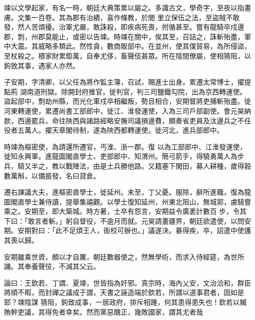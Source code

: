 \begin{pinyinscope}
 竦以文學起家，有名一時，朝廷大典策累以屬之。多識古文，學奇字，至夜以指畫膚。文集一百卷。其為郡有治績，喜作條教，於閭
 里立保伍之法，至盜賊不敢發，然人苦煩擾。治軍尤嚴，敢誅殺，即疾病死喪，拊循甚至。嘗有龍騎卒戍邊郡，剽，州郡莫能止，或密以告竦。時竦在關中，俟其至，召詰之，誅斬殆盡，軍中大震。其威略多類此。然性貪，數商販部中。在並州，使其僕貿易，為所侵盜，至杖殺之。積家財累鉅萬，自奉尤侈，畜聲伎甚眾。所在陰間僚屬，使相猜阻，以鉤致其事，遇家人亦然。



 子安期，字清卿，以父任為將作監主簿，召試，賜進士出身。累遷太常博士，擢提點荊
 湖南道刑獄。除開封府推官，徙判官，判三司鹽鐵勾院，出為京西轉運使。盜起部中，剽劫州縣，而光化軍戍卒相繼叛，勢且相合，安期督將吏捕斬殆盡。徙河東轉運使，累遷尚書工部郎中，徙江、淮發運使，入為三司戶部副使。會元昊納款，西邊罷兵，命往陜西與諸路經略安撫司議損邊費，頗奏省吏員及汰邊兵之不任役者五萬人。擢天章閣待制，遂為陜西都轉運使。徙河北，進兵部郎中。



 時竦為樞密使，為請還所遷官，丐淮、浙一郡。復
 以為工部郎中、江淮發運使，徙知永興軍。進龍圖閣直學士、吏部郎中、知渭州。簡弓箭手，得驍勇萬人為步兵，騎又半之，教以戰陣法，由是土兵勝他路。又籍塞下閑田，募人耕種，歲得穀數萬斛，以備振發，名曰貸倉。



 遷右諫議大夫，進樞密直學士，徙延州。未至，丁父憂。服除，辭所進職，復為龍圖閣直學士兼侍讀，提舉集禧觀。以學士復知延州，州東北阻山，無城郭，虜騎嘗乘之。安期至，即大築城。時方暑，士卒有怨言，安期益令廣袤計數百
 步，令其下曰：「敢言者斬。」躬自督役，不逾月而就。元昊請畫疆界，朝廷欲遣使，以問安期。安期對曰：「此不足煩王人，衙校可辦也。」議遂決。暴得疾，卒，詔遣中使護其喪以歸。



 安期雖乘世資，頗以才自厲，朝廷數器使之，然無學術，而求入侍經筵，為世所譏。其奉養聲伎，不減其父云。



 論曰：王欽若、丁謂、夏竦，世皆指為奸邪。真宗時，海內乂安，文治洽和，群臣將順不暇，而封禪之議成于謂，天書之誣造端於欽若，所謂以道事君者，固如是耶？竦陰謀
 猜阻，鉤致成事，一居政府，排斥相踵，何其患得患失也！欽若以贓賄幹吏議，其得免者幸矣。然而黨惡醜正，幾敗國家，謂其尤者哉



\end{pinyinscope}